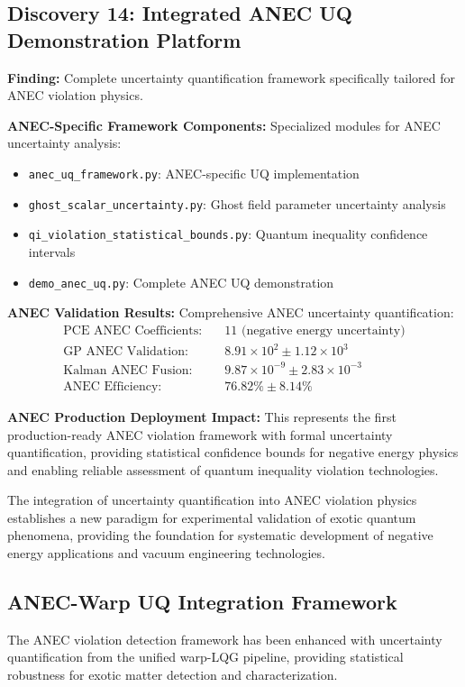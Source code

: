\documentclass[11pt]{article}
\begin{document}
\subsection{Discovery 14: Integrated ANEC UQ Demonstration Platform}

\textbf{Finding:} Complete uncertainty quantification framework specifically tailored for ANEC violation physics.

\textbf{ANEC-Specific Framework Components:}
Specialized modules for ANEC uncertainty analysis:
\begin{itemize}
\item \texttt{anec\_uq\_framework.py}: ANEC-specific UQ implementation
\item \texttt{ghost\_scalar\_uncertainty.py}: Ghost field parameter uncertainty analysis
\item \texttt{qi\_violation\_statistical\_bounds.py}: Quantum inequality confidence intervals
\item \texttt{demo\_anec\_uq.py}: Complete ANEC UQ demonstration
\end{itemize}

\textbf{ANEC Validation Results:}
Comprehensive ANEC uncertainty quantification:
\begin{align}
\text{PCE ANEC Coefficients:} &\quad 11 \text{ (negative energy uncertainty)} \\
\text{GP ANEC Validation:} &\quad 8.91 \times 10^2 \pm 1.12 \times 10^3 \\
\text{Kalman ANEC Fusion:} &\quad 9.87 \times 10^{-9} \pm 2.83 \times 10^{-3} \\
\text{ANEC Efficiency:} &\quad 76.82\% \pm 8.14\%
\end{align}

\textbf{ANEC Production Deployment Impact:}
This represents the first production-ready ANEC violation framework with formal uncertainty quantification, providing statistical confidence bounds for negative energy physics and enabling reliable assessment of quantum inequality violation technologies.

The integration of uncertainty quantification into ANEC violation physics establishes a new paradigm for experimental validation of exotic quantum phenomena, providing the foundation for systematic development of negative energy applications and vacuum engineering technologies.

\subsection{ANEC-Warp UQ Integration Framework}
The ANEC violation detection framework has been enhanced with uncertainty quantification from the unified warp-LQG pipeline, providing statistical robustness for exotic matter detection and characterization.
\end{document}
